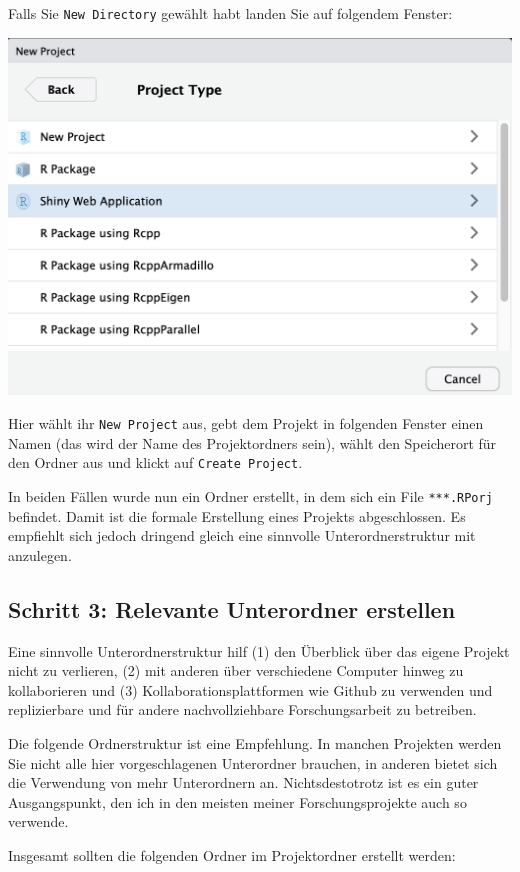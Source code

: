 \documentclass[]{tufte-book}
\begin{document}
Falls Sie \texttt{New\ Directory} gewählt habt landen Sie auf folgendem
Fenster:

\begin{center}\includegraphics[width=0.6\linewidth]{figures/r-studio-new-project-new-dir} \end{center}

Hier wählt ihr \texttt{New\ Project} aus, gebt dem Projekt in folgenden
Fenster einen Namen (das wird der Name des Projektordners sein), wählt
den Speicherort für den Ordner aus und klickt auf
\texttt{Create\ Project}.

In beiden Fällen wurde nun ein Ordner erstellt, in dem sich ein File
\texttt{***.RPorj} befindet. Damit ist die formale Erstellung eines
Projekts abgeschlossen. Es empfiehlt sich jedoch dringend gleich eine
sinnvolle Unterordnerstruktur mit anzulegen.

\subsection{Schritt 3: Relevante Unterordner
erstellen}\label{schritt-3-relevante-unterordner-erstellen}

Eine sinnvolle Unterordnerstruktur hilf (1) den Überblick über das
eigene Projekt nicht zu verlieren, (2) mit anderen über verschiedene
Computer hinweg zu kollaborieren und (3) Kollaborationsplattformen wie
Github zu verwenden und replizierbare und für andere nachvollziehbare
Forschungsarbeit zu betreiben.

Die folgende Ordnerstruktur ist eine Empfehlung. In manchen Projekten
werden Sie nicht alle hier vorgeschlagenen Unterordner brauchen, in
anderen bietet sich die Verwendung von mehr Unterordnern an.
Nichtsdestotrotz ist es ein guter Ausgangspunkt, den ich in den meisten
meiner Forschungsprojekte auch so verwende.

Insgesamt sollten die folgenden Ordner im Projektordner erstellt werden:
\end{document}
